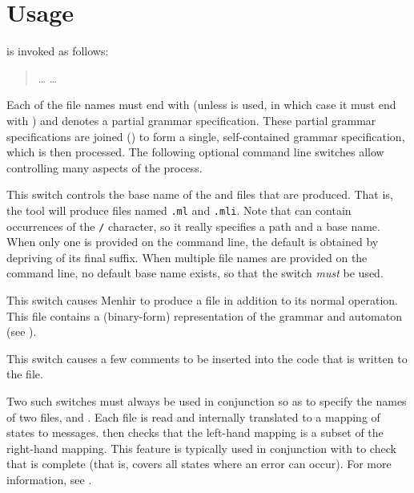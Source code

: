 \documentclass[onecolumn,11pt,nocopyrightspace,preprint]{sigplanconf}
\begin{document}

\section{Usage}

\menhir is invoked as follows:
\begin{quote}
\cmenhir {} \ldots {}  \ldots {}
\end{quote}
Each of the file names must end with \mly (unless \ocoq is used,
in which case it must end with \vy) and denotes a partial
grammar specification. These partial grammar specifications are joined
() to form a single, self-contained grammar specification,
which is then processed. The following optional command line switches allow
controlling many aspects of the process.

 This switch controls the base name
of the \ml and \mli files that are produced. That is, the tool will produce
files named \texttt{.ml} and \texttt{.mli}. Note
that  can contain occurrences of the \texttt{/} character, so it
really specifies a path and a base name. When only one  is
provided on the command line, the default  is obtained by
depriving  of its final \mly suffix. When multiple file
names are provided on the command line, no default base name exists, so that
the \obase switch \emph{must} be used.

\docswitch{\ocmly} This switch causes Menhir to produce a \cmly file in
addition to its normal operation. This file contains a (binary-form)
representation of the grammar and automaton (see ).

\docswitch{\ocomment} This switch causes a few comments to be inserted into the
\ocaml code that is written to the \ml file.

 Two
such switches must always be used in conjunction so as to specify the names of
two \messages files,  and . Each file is read and
internally translated to a mapping of states to messages. \menhir then checks
that the left-hand mapping is a subset of the right-hand mapping. This feature
is typically used in conjunction with \olisterrors to check that 
is complete (that is, covers all states where an error can occur).
For more information, see .
\end{document}

